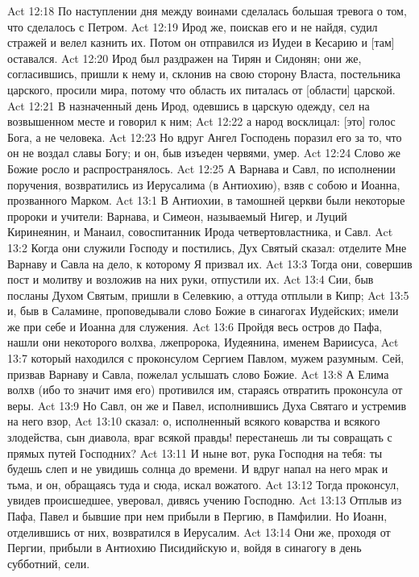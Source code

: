 Act 12:18  По наступлении дня между воинами сделалась большая тревога о том, что сделалось с Петром.
Act 12:19  Ирод же, поискав его и не найдя, судил стражей и велел казнить их. Потом он отправился из Иудеи в Кесарию и [там] оставался.
Act 12:20  Ирод был раздражен на Тирян и Сидонян; они же, согласившись, пришли к нему и, склонив на свою сторону Власта, постельника царского, просили мира, потому что область их питалась от [области] царской.
Act 12:21  В назначенный день Ирод, одевшись в царскую одежду, сел на возвышенном месте и говорил к ним;
Act 12:22  а народ восклицал: [это] голос Бога, а не человека.
Act 12:23  Но вдруг Ангел Господень поразил его за то, что он не воздал славы Богу; и он, быв изъеден червями, умер.
Act 12:24  Слово же Божие росло и распространялось.
Act 12:25  А Варнава и Савл, по исполнении поручения, возвратились из Иерусалима (в Антиохию), взяв с собою и Иоанна, прозванного Марком.
Act 13:1  В Антиохии, в тамошней церкви были некоторые пророки и учители: Варнава, и Симеон, называемый Нигер, и Луций Киринеянин, и Манаил, совоспитанник Ирода четвертовластника, и Савл.
Act 13:2  Когда они служили Господу и постились, Дух Святый сказал: отделите Мне Варнаву и Савла на дело, к которому Я призвал их.
Act 13:3  Тогда они, совершив пост и молитву и возложив на них руки, отпустили их.
Act 13:4  Сии, быв посланы Духом Святым, пришли в Селевкию, а оттуда отплыли в Кипр;
Act 13:5  и, быв в Саламине, проповедывали слово Божие в синагогах Иудейских; имели же при себе и Иоанна для служения.
Act 13:6  Пройдя весь остров до Пафа, нашли они некоторого волхва, лжепророка, Иудеянина, именем Вариисуса,
Act 13:7  который находился с проконсулом Сергием Павлом, мужем разумным. Сей, призвав Варнаву и Савла, пожелал услышать слово Божие.
Act 13:8  А Елима волхв (ибо то значит имя его) противился им, стараясь отвратить проконсула от веры.
Act 13:9  Но Савл, он же и Павел, исполнившись Духа Святаго и устремив на него взор,
Act 13:10  сказал: о, исполненный всякого коварства и всякого злодейства, сын диавола, враг всякой правды! перестанешь ли ты совращать с прямых путей Господних?
Act 13:11  И ныне вот, рука Господня на тебя: ты будешь слеп и не увидишь солнца до времени. И вдруг напал на него мрак и тьма, и он, обращаясь туда и сюда, искал вожатого.
Act 13:12  Тогда проконсул, увидев происшедшее, уверовал, дивясь учению Господню.
Act 13:13  Отплыв из Пафа, Павел и бывшие при нем прибыли в Пергию, в Памфилии. Но Иоанн, отделившись от них, возвратился в Иерусалим.
Act 13:14  Они же, проходя от Пергии, прибыли в Антиохию Писидийскую и, войдя в синагогу в день субботний, сели.
